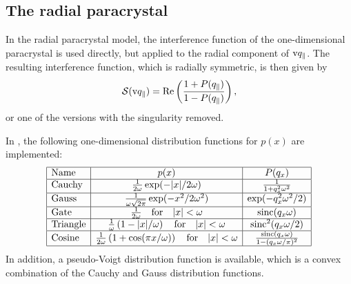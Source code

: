
\subsection{The radial paracrystal} \label{sec:sect:radialparacrystal}
In the radial paracrystal model, the interference function of the one-dimensional paracrystal is used directly, but applied to
the radial component of $\text{v}{q}_\parallel$. The resulting interference function, which is radially symmetric, is then given by
\begin{equation}
  \mathcal{S}(\text{v}{q}_\parallel) =  \operatorname{Re}\left(\frac{1+P(q_\parallel)}{1-P(q_\parallel)}\right),
\end{equation}
or one of the versions with the singularity removed.

In \BornAgain, the following one-dimensional distribution functions for $p(x)$ are implemented:
\begin{equation}
  \begin{array}{|l|c|c|}
    \hline
    \text{Name} & p(x) & P(q_x) \\
    \hline
    \text{Cauchy} & \frac{1}{2\omega} \exp(-|x|/2\omega) & \frac{1}{1+q_x^2\omega^2} \\
    \hline
    \text{Gauss} & \frac{1}{\omega\sqrt{2\pi}} \exp(-x^2/2\omega^2) & \exp(-q_x^2\omega^2/2) \\
    \hline
    \text{Gate} & \frac{1}{2\omega}  \quad \text{for} \quad |x|<\omega & \operatorname{sinc}(q_x\omega) \\
    \hline
    \text{Triangle} & \frac{1}{\omega}\left(1 - |x|/\omega\right)  \quad \text{for} \quad |x|<\omega & \operatorname{sinc}^2(q_x \omega/2) \\
    \hline
    \text{Cosine} &  \frac{1}{2\omega}\left(1 + \cos(\pi x/\omega) \right)  \quad \text{for} \quad |x|<\omega & \frac{\operatorname{sinc}(q_x \omega)}{1-(q_x\omega/\pi)^2} \\
    \hline
  \end{array}
\end{equation}
In addition, a pseudo-Voigt distribution function is available, which is a convex combination of the Cauchy and Gauss distribution functions.

